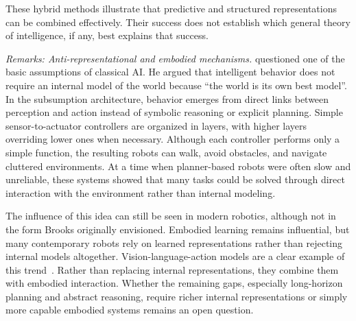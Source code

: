\documentclass[acmsmall,screen,review,anonymous]{acmart}
\begin{document}
These hybrid methods illustrate that predictive and structured representations can be combined effectively.
%
Their success does not establish which general theory of intelligence, if any, best explains that success.


\noindent\textit{Remarks: Anti-representational and embodied mechanisms.}
\label{par:anti-rep}
\citet{brooks1991} questioned one of the basic assumptions of classical AI.
%
He argued that intelligent behavior does not require an internal model of the world because ``the world is its own best model''. 
%
In the subsumption architecture, behavior emerges from direct links between perception and action instead of symbolic reasoning or explicit planning.
%
Simple sensor-to-actuator controllers are organized in layers, with higher layers overriding lower ones when necessary.
%
Although each controller performs only a simple function, the resulting robots can walk, avoid obstacles, and navigate cluttered environments. 
%
At a time when planner-based robots were often slow and unreliable, these systems showed that many tasks could be solved through direct interaction with the environment rather than internal modeling.

The influence of this idea can still be seen in modern robotics, although not in the form Brooks originally envisioned. 
%
Embodied learning remains influential, but many contemporary robots rely on learned representations rather than rejecting internal models altogether.
%
Vision-language-action models are a clear example of this trend~\citep{brohan2023rt2visionlanguageactionmodelstransfer, kim24openvla, nvidia2025gr00tn1openfoundation}. 
%
Rather than replacing internal representations, they combine them with embodied interaction.
%
Whether the remaining gaps, especially long-horizon planning and abstract reasoning, require richer internal representations or simply more capable embodied systems remains an open question.
\end{document}
